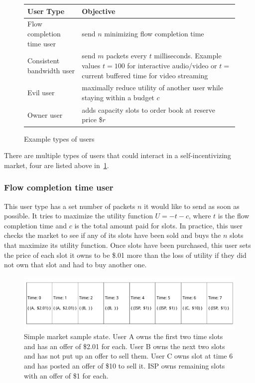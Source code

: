 \begin{figure}
\begin{tabular}{|p{}|p{}|}
\hline
User Type & Objective \\
\hline
Flow completion time user & send $n$ minimizing flow completion time \\
\hline
Consistent bandwidth user & send $m$ packets every $t$ milliseconds. Example values $t=100$ for interactive audio/video or $t=$ current buffered time for video streaming \\
\hline
Evil user & maximally reduce utility of another user while staying within a budget $c$ \\
\hline
Owner user & adds capacity slots to order book at reserve price \$$r$\\
\hline
\end{tabular}
\caption{Example types of users}
\label{f:user_types}
\end{figure}
There are multiple types of users that could interact in a self-incentivizing market, four are listed above in~\ref{f:user_types}.

\subsubsection{Flow completion time user}
This user type has a set number of packets $n$ it would like to send as soon as possible. It tries to maximize the utility function $U= -t - c$, where $t$ is the flow completion time and $c$ is the total amount paid for slots. In practice, this user checks the market to see if any of its slots have been sold and buys the $n$ slots that maximize its utility function. Once slots have been purchased, this user sets the price of each slot it owns to be \$.01 more than the loss of utility if they did not own that slot and had to buy another one.

\begin{figure}
\includegraphics[width=\columnwidth]{diagrams/simple_market.pdf}
\caption{Simple market sample state. User A owns the first two time slots and has an offer of \$2.01 for each. User B owns the next two slots and has not put up an offer to sell them. User C owns slot at time 6 and has posted an offer of \$10 to sell it. ISP owns remaining slots with an offer of \$1 for each.}
\label{f:simple_market}
\end{figure}

